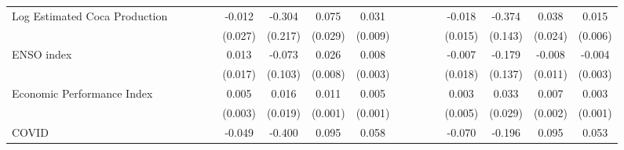 \begin{tabular}{lcccccccccccccccc}
\addlinespace
Log Estimated Coca Production&                     &                     &                     &                     &      -0.012         &      -0.304         &       0.075\sym{**} &       0.031\sym{**} &                     &                     &                     &                     &      -0.018         &      -0.374\sym{**} &       0.038         &       0.015\sym{*}  \\
                    &                     &                     &                     &                     &     (0.027)         &     (0.217)         &     (0.029)         &     (0.009)         &                     &                     &                     &                     &     (0.015)         &     (0.143)         &     (0.024)         &     (0.006)         \\
\addlinespace
ENSO index          &                     &                     &                     &                     &       0.013         &      -0.073         &       0.026\sym{**} &       0.008\sym{*}  &                     &                     &                     &                     &      -0.007         &      -0.179         &      -0.008         &      -0.004         \\
                    &                     &                     &                     &                     &     (0.017)         &     (0.103)         &     (0.008)         &     (0.003)         &                     &                     &                     &                     &     (0.018)         &     (0.137)         &     (0.011)         &     (0.003)         \\
\addlinespace
Economic Performance Index&                     &                     &                     &                     &       0.005         &       0.016         &       0.011\sym{***}&       0.005\sym{***}&                     &                     &                     &                     &       0.003         &       0.033         &       0.007\sym{**} &       0.003\sym{***}\\
                    &                     &                     &                     &                     &     (0.003)         &     (0.019)         &     (0.001)         &     (0.001)         &                     &                     &                     &                     &     (0.005)         &     (0.029)         &     (0.002)         &     (0.001)         \\
\addlinespace
COVID               &                     &                     &                     &                     &      -0.049         &      -0.400         &       0.095\sym{**} &       0.058\sym{***}&                     &                     &                     &                     &      -0.070         &      -0.196         &       0.095\sym{**} &       0.053\sym{**} \\

\end{tabular}
